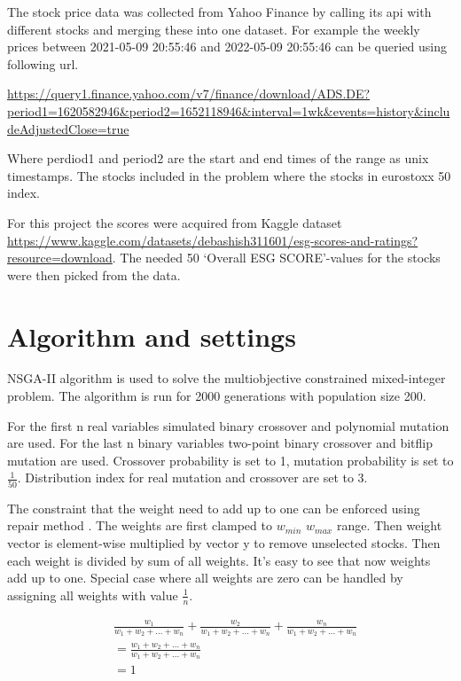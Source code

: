 \documentclass[11pt]{article} %
\begin{document}
The stock price data was collected from Yahoo Finance by calling its api with different stocks and merging these into one dataset. For example the weekly prices between 2021-05-09 20:55:46 and 2022-05-09 20:55:46 can be queried using following url.

\url{https://query1.finance.yahoo.com/v7/finance/download/ADS.DE?period1=1620582946&period2=1652118946&interval=1wk&events=history&includeAdjustedClose=true}

Where perdiod1 and period2 are the start and end times of the range as unix timestamps. The stocks included in the problem where the stocks in eurostoxx 50 index.

For this project the scores were acquired from Kaggle dataset \url{https://www.kaggle.com/datasets/debashish311601/esg-scores-and-ratings?resource=download}. The needed 50 `Overall ESG SCORE'-values for the stocks were then picked from the data. 


\section{Algorithm and settings}

NSGA-II algorithm is used to solve the multiobjective constrained mixed-integer problem. The algorithm is run for 2000 generations with population size 200.

For the first n real variables simulated binary crossover and polynomial mutation are used. For the last n binary variables two-point binary crossover and bitflip mutation are used. Crossover probability is set to 1, mutation probability is set to $\frac{1}{50}$. Distribution index for real mutation and crossover are set to 3. 

The constraint that the weight need to add up to one can be enforced using repair method \cite{kaucic2019portfolio}. The weights are first clamped to $w_{min}$ $w_{max}$ range. Then weight vector is element-wise multiplied by vector y to remove unselected stocks. Then each weight is divided by sum of all weights. It's easy to see that now weights add up to one. Special case where all weights are zero can be handled by assigning all weights with value $\frac{1}{n}$.

\begin{equation}
\begin{split}
&\frac{w_1}{w_1 + w_2 + ... + w_n} + \frac{w_2}{w_1 + w_2 + ... + w_n} + \frac{w_n}{w_1 + w_2 + ... + w_n}\\
&= \frac{w_1 + w_2 + ...  +w_n}{w_1 + w_2 + ... + w_n}\\
&= 1
\end{split}
\end{equation}
\end{document}
